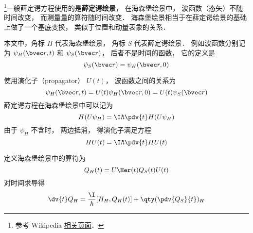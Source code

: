 
\begin{issues}
\issueDraft
\end{issues}


\footnote{参考 Wikipedia \href{https://en.wikipedia.org/wiki/Heisenberg_picture}{相关页面}．}一般薛定谔方程使用的是\textbf{薛定谔绘景}， 在海森堡绘景中， 波函数（态矢）不随时间改变， 而测量量的算符随时间改变． 海森堡绘景相当于在薛定谔绘景的基础上做了一个基底变换， 类似于位置和动量表象的关系．

本文中，角标 $H$ 代表海森堡绘景， 角标 $S$ 代表薛定谔绘景． 例如波函数分别记为 $\psi_H(\bvec r, t)$ 和 $\psi_S(\bvec r)$， 后者不是时间的函数， 它的定义是
\begin{equation}
\psi_S(\bvec r) = \psi_H(\bvec r, 0)
\end{equation}


使用演化子（propagator） $U(t)$， 波函数之间的关系为
\begin{equation}
\psi_H(\bvec r, t) = U(t) \psi_H(\bvec r, 0) = U(t) \psi_S(\bvec r)
\end{equation}
薛定谔方程在海森堡绘景中可以记为
\begin{equation}
H(U\psi_H) = \I\hbar \pdv{t} H(U\psi_H)
\end{equation}
由于 $\psi_H$ 不含时， 两边抵消， 得演化子满足方程
\begin{equation}
H U(t) = \I\hbar \pdv{t} H U(t)
\end{equation}

定义海森堡绘景中的算符为
\begin{equation}
Q_H(t) = U\Her(t) Q_S(t) U(t)
\end{equation}
对时间求导得
\begin{equation}
\dv{t}Q_H = \frac{\I}{\hbar} [H_H, Q_H(t)] + \qty(\pdv{Q_S}{t})_H
\end{equation}
